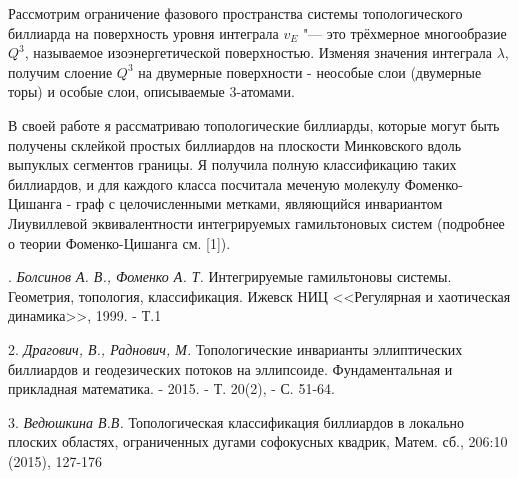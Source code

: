 Рассмотрим ограничение фазового пространства системы топологического биллиарда на поверхность уровня интеграла $v_E$ "--- это трёхмерное многообразие $Q^3$, называемое изоэнергетической поверхностью. Изменяя значения интеграла $\lambda$, получим слоение $Q^3$ на двумерные поверхности - неособые слои (двумерные торы) и особые слои, описываемые 3-атомами.

В своей работе я рассматриваю топологические биллиарды, которые могут быть получены склейкой простых биллиардов на плоскости Минковского вдоль выпуклых сегментов границы. Я получила полную классификацию таких биллиардов, и для каждого класса посчитала меченую молекулу Фоменко-Цишанга - граф с целочисленными метками, являющийся инвариантом Лиувиллевой эквивалентности интегрируемых гамильтоновых систем (подробнее о теории Фоменко-Цишанга см. [1]).





. {\it Болсинов А. В., Фоменко А. Т.} Интегрируемые гамильтоновы системы. Геометрия, топология, классификация. Ижевск НИЦ <<Регулярная и хаотическая динамика>>, 1999. - Т.1


2. {\it Драгович, В., Раднович, М.} Топологические инварианты эллиптических биллиардов и геодезических потоков на эллипсоиде. Фундаментальная и прикладная математика. - 2015. - Т. 20(2), - С. 51-64.

3. {\it Ведюшкина В.В.} Топологическая классификация биллиардов в локально плоских областях,
ограниченных дугами софокусных квадрик, Матем. сб., 206:10 (2015), 127-176

